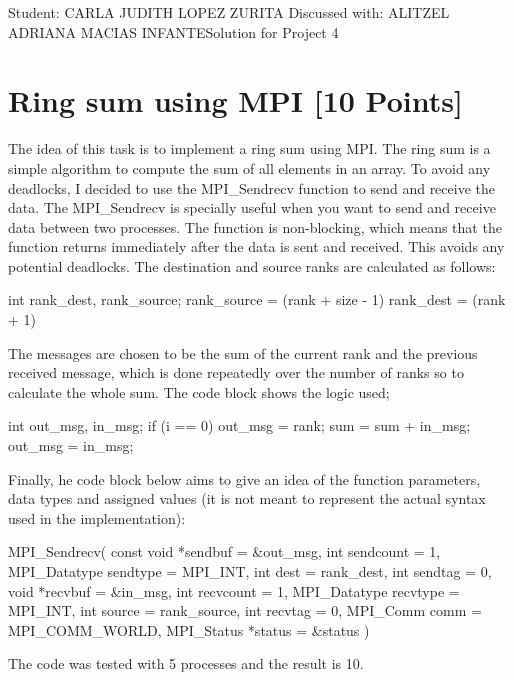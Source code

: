 \documentclass[unicode,11pt,a4paper,oneside,numbers=endperiod,openany]{scrartcl}
\begin{document}
\setassignment
{}

            {Student: CARLA JUDITH LOPEZ ZURITA}
            {Discussed with: ALITZEL ADRIANA MACIAS INFANTE}{Solution for Project 4}{}
\newline

\assignmentpolicy

\section{Ring sum using MPI [10 Points]}
The idea of this task is to implement a ring sum using MPI. The ring sum is a
simple algorithm to compute the sum of all elements in an array. To avoid any
deadlocks, I decided to use the
MPI\_Sendrecv function to send and receive the data.
The MPI\_Sendrecv is specially useful when you want to send and receive data
between two processes. The function is non-blocking, which means that the
function returns immediately after the data is sent and received. This avoids
any potential deadlocks.
The destination and source ranks are calculated as follows:
\begin{cppverbatim}
int rank_dest, rank_source;
rank_source = (rank + size - 1)
rank_dest = (rank + 1)
\end{cppverbatim}
The messages are chosen to be the sum of the current rank and the previous
received message, which is done repeatedly over the number of ranks so to
calculate the whole sum. The code block shows the logic used;
\begin{cppverbatim}
int out_msg, in_msg;
if (i == 0)
{
    out_msg = rank;
}
sum = sum + in_msg;
out_msg = in_msg;
\end{cppverbatim}
Finally, he code block below aims to give an idea of the function parameters, data types and
assigned values (it is not meant to represent the actual syntax used in the
implementation):
\begin{cppverbatim}
MPI_Sendrecv(
    const void *sendbuf = &out_msg,
    int sendcount = 1,
    MPI_Datatype sendtype = MPI_INT,
    int dest = rank_dest,
    int sendtag = 0,
    void *recvbuf = &in_msg,
    int recvcount = 1,
    MPI_Datatype recvtype = MPI_INT,
    int source = rank_source,
    int recvtag = 0,
    MPI_Comm comm = MPI_COMM_WORLD,
    MPI_Status *status = &status
)
\end{cppverbatim}
The code was tested with 5 processes and the result is 10.
\end{document}
